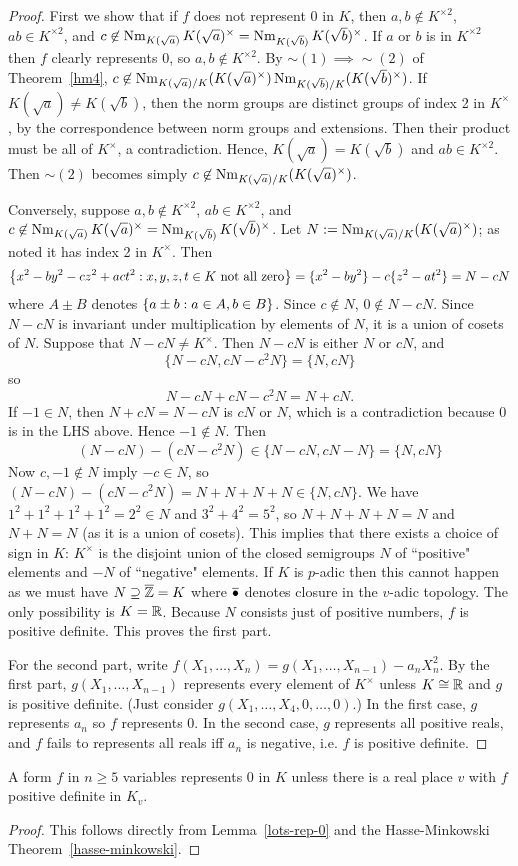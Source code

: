 \begin{proof}
First we show that if $f$ does not represent 0 in $K$, then $a,b\nin K^{\times 2}$, $ab\in K^{\times 2}$, and $c\not\in \operatorname{Nm}_{K(\sqrt{a})}K(\sqrt{a})^{\times}=\operatorname{Nm}_{K(\sqrt{b})}K(\sqrt{b})^{\times}$.
If $a$ or $b$ is in $K^{\times2}$ then $f$ clearly represents 0, so  $a,b\nin K^{\times 2}$. By $\sim(1)\implies \sim (2)$ of Theorem~\ref{hm4}, $c\not\in \operatorname{Nm}_{K(\sqrt{a})/K}(K(\sqrt{a})^{\times})\operatorname{Nm}_{K(\sqrt{b})/K}(K(\sqrt{b})^{\times})$. If $K(\sqrt a)\ne K(\sqrt b)$, then the norm groups are distinct groups of index 2 in $K^{\times}$, by the correspondence between norm groups and extensions. Then their product must be all of $K^{\times}$, a contradiction. Hence, $K(\sqrt a)=K(\sqrt b)$ and $ab\in K^{\times 2}$. %
Then $\sim(2)$ becomes simply $c\not\in \operatorname{Nm}_{K(\sqrt{a})/K}(K(\sqrt{a})^{\times})$.

Conversely, suppose $a,b\nin K^{\times 2}$, $ab\in K^{\times 2}$, and $c\not\in \operatorname{Nm}_{K(\sqrt{a})}K(\sqrt{a})^{\times}=\operatorname{Nm}_{K(\sqrt{b})}K(\sqrt{b})^{\times}$. Let $N:=\operatorname{Nm}_{K(\sqrt{a})/K}(K(\sqrt{a})^{\times})$; as noted it has index 2 in $K^{\times}$. Then
\[
\left\{{x^2-by^2-cz^2+act^2}:{x,y,z,t\in K\text{ not all zero}}\right\}
=
\{x^2-by^2\}-c\{z^2-at^2\}=N-cN\]
where $A\pm B$ denotes $\left\{{a\pm b}:{a\in A,b\in B}\right\}$. Since $c\nin N$, $0\nin N-cN$. Since $N-cN$ is invariant under multiplication by elements of $N$, it is a union of cosets of $N$. Suppose that $N-cN\ne K^{\times}$. Then $N-cN$ is either $N$ or $cN$, and 
\[
\{N-cN,cN-c^2N\}=\{N,cN\}
\]
so
\[
N-cN+cN-c^2N=N+cN.
\]
If $-1\in N$, then $N+cN=N-cN$ is $cN$ or $N$, which is a contradiction because 0 is in the LHS above. Hence $-1\nin N$. Then
\[
(N-cN)-(cN-c^2N)\in \{N-cN,cN-N\}=\{N,cN\}
\]
Now $c,-1\nin N$ imply $-c\in N$, so %
$(N-cN)-(cN-c^2N)=N+N+N+N\in \{N,cN\}$. We have $1^2+1^2+1^2+1^2=2^2\in N$ and $3^2+4^2=5^2$, so $N+N+N+N=N$ and $N+N=N$ (as it is a union of cosets). 
This implies that there exists a choice of sign in $K$: $K^{\times}$ is the disjoint union of the closed semigroups $N$ of ``positive" elements and $-N$ of ``negative" elements. If $K$ is $p$-adic then this cannot happen as we must have $N\supseteq \overline{\mathbb{Z}}=K$ where $\overline{\bullet}$ denotes closure in the $v$-adic topology. The only possibility is $K=\mathbb{R}$. Because $N$ consists just of positive numbers, $f$ is positive definite. This proves the first part.

For the second part, write $f(X_1,\ldots, X_n)=g(X_1,\ldots, X_{n-1})-a_nX_n^2$. By the first part, $g(X_1,\ldots, X_{n-1})$ represents every element of $K^{\times}$ unless $K\cong \mathbb{R}$ and $g$ is positive definite. (Just consider $g(X_1,\ldots, X_4,0,\ldots, 0)$.) In the first case, $g$ represents $a_n$ so $f$ represents 0. In the second case, $g$ represents all positive reals, and $f$ fails to represents all reals iff $a_n$ is negative, i.e. $f$ is positive definite.
\end{proof}
\begin{cor}
A form $f$ in $n\ge 5$ variables represents 0 in $K$ unless there is a real place $v$ with $f$ positive definite in $K_v$.
\end{cor}
\begin{proof}
This follows directly from Lemma~\ref{lots-rep-0} and the Hasse-Minkowski Theorem~\ref{hasse-minkowski}.
\end{proof}
